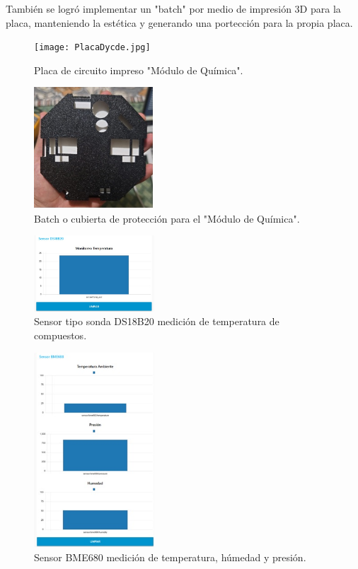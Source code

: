 \documentclass[10pt,twocolumn,letterpaper]{article}
\begin{document}
\begin{Abstract}
También se logró implementar un "batch" por medio de impresión 3D para la placa, manteniendo la estética y generando una portección para la propia placa.


\begin{figure}
  \centering
  \texttt{[image: PlacaDycde.jpg]}
  \caption{Placa de circuito impreso "Módulo de Química".}
\end{figure}

\begin{figure}
  \centering
  \includegraphics[width=0.4\textwidth]{BatchPlaca.jpg}
  \caption{Batch o cubierta de protección para el "Módulo de Química".}
\end{figure}

\begin{figure}
  \centering
  \includegraphics[width=0.4\textwidth]{DS18B20.jpg}
  \caption{Sensor tipo sonda DS18B20 medición de temperatura de compuestos.}
\end{figure}

\begin{figure}
  \centering
  \includegraphics[width=0.4\textwidth]{MedidasAmbientales.jpg}
  \caption{Sensor BME680 medición de temperatura, húmedad y presión.}
\end{figure}


\end{Abstract}
\end{document}
